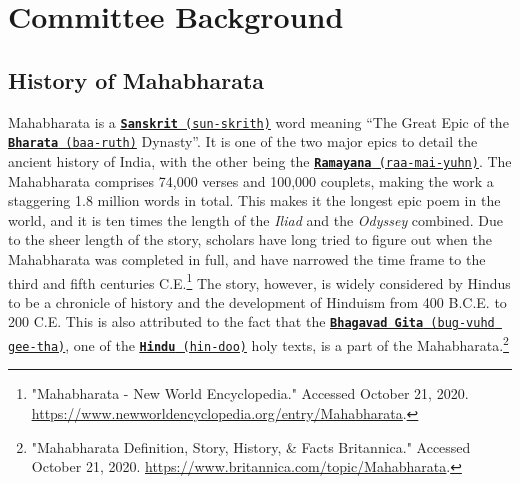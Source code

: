 \documentclass[10pt, letterpaper]{article}
\begin{document}
\newpage
\section{Committee Background}
\subsection{History of Mahabharata}

Mahabharata is a
\texttt{\underline{\href{https://drive.google.com/file/d/1tnbVYD9NxvcBGNo234wo7V1erBmfM39e/view?usp=sharing}{\textbf{Sanskrit}}
(sun-skrith)}} word meaning ``The Great Epic of the
\texttt{\underline{\href{https://drive.google.com/file/d/1CM2SWn9Ga6b8EJJHPf9uSBCQ5e5R3w-B/view?usp=sharing}{\textbf{Bharata}}
(baa-ruth)}} Dynasty''. It is one of the two major epics to detail the
ancient history of India, with the other being the
\texttt{\underline{\href{https://drive.google.com/file/d/1Z0gwiwo5oJ2E381tErtuf8x_P8xo12LC/view?usp=sharing}{\textbf{Ramayana}}
(raa-mai-yuhn)}}. The Mahabharata comprises 74,000 verses and 100,000
couplets, making the work a staggering 1.8 million words in total. This
makes it the longest epic poem in the world, and it is ten times the
length of the \emph{Iliad} and the \emph{Odyssey} combined. Due to the
sheer length of the story, scholars have long tried to figure out when
the Mahabharata was completed in full, and have narrowed the time frame
to the third and fifth centuries C.E.\footnote{"Mahabharata - New World
  Encyclopedia." Accessed October 21, 2020.
  \href{https://www.newworldencyclopedia.org/entry/Mahabharata}{\underline{https://www.newworldencyclopedia.org/entry/Mahabharata}}.}
The story, however, is widely considered by Hindus to be a chronicle of
history and the development of Hinduism from 400 B.C.E. to 200 C.E. This
is also attributed to the fact that the
\texttt{\underline{\href{https://drive.google.com/file/d/1dDCchIaspH3Gc2X0PsDk8tKNUr-pomEB/view?usp=sharing}{\textbf{Bhagavad
Gita}} (bug-vuhd gee-tha)}}, one of the
\texttt{\underline{\href{https://drive.google.com/file/d/16l7bBvgQJhfYlYcDWtfayBRAAy1PLmzL/view?usp=sharing}{\textbf{Hindu}}
(hin-doo)}} holy texts, is a part of the Mahabharata.\footnote{"Mahabharata
   Definition, Story, History, \& Facts
  Britannica." Accessed October 21, 2020.
  \href{https://www.britannica.com/topic/Mahabharata}{\underline{https://www.britannica.com/topic/Mahabharata}}.} \\
\end{document}
